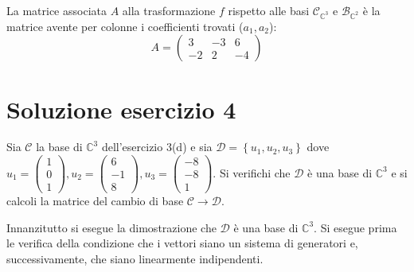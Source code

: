 \documentclass[a4paper]{article}
\begin{document}
	La matrice associata $A$ alla trasformazione $f$ rispetto alle basi $\mathscr{C}_{\mathbb{C}^{3}}$ e $\mathscr{B}_{\mathbb{C}^{2}}$ è la matrice avente per colonne i coefficienti trovati ($a_{1}, a_{2}$):
	\begin{equation*}
		A = \begin{pmatrix}
			 3 & -3 &  6 \\
			-2 &  2 &  -4
		\end{pmatrix}
	\end{equation*}\newpage
	
	\section{Soluzione esercizio 4}
	
	Sia $\mathscr{C}$ la base di $\mathbb{C}^{3}$ dell'esercizio 3(d) e sia $\mathscr{D} = \left\{u_{1}, u_{2}, u_{3}\right\}$ dove $u_{1} = \begin{pmatrix}
		1 \\ 0 \\ 1
	\end{pmatrix}, u_{2} = \begin{pmatrix}
		6 \\ -1 \\ 8
	\end{pmatrix}, u_{3} = \begin{pmatrix}
		-8 \\ -8 \\ 1
	\end{pmatrix}$. Si verifichi che $\mathscr{D}$ è una base di $\mathbb{C}^{3}$ e si calcoli la matrice del cambio di base $\mathscr{C} \rightarrow \mathscr{D}$.\newline
	
	\noindent
	Innanzitutto si esegue la dimostrazione che $\mathscr{D}$ è una base di $\mathbb{C}^{3}$. Si esegue prima le verifica della condizione che i vettori siano un sistema di generatori e, successivamente, che siano linearmente indipendenti.
	
\end{document}
